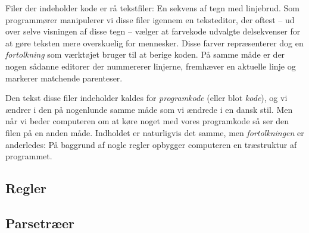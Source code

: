 Filer der indeholder kode er rå tekstfiler: En sekvens af tegn med linjebrud. Som programmører manipulerer vi disse filer igennem en teksteditor, der oftest -- ud over selve visningen af disse tegn -- vælger at farvekode udvalgte delsekvenser for at gøre teksten mere overskuelig for mennesker. Disse farver repræsenterer dog en \textsl{fortolkning} som værktøjet bruger til at berige koden. På samme måde er der nogen sådanne editorer der nummererer linjerne, fremhæver en aktuelle linje og markerer matchende parenteser.

Den tekst disse filer indeholder kaldes for \textsl{programkode} (eller blot \textsl{kode}), og vi ændrer i den på nogenlunde samme måde som vi ændrede i en dansk stil. Men når vi beder computeren om at køre noget med vores programkode så ser den filen på en anden måde. Indholdet er naturligvis det samme, men \textsl{fortolkningen} er anderledes: På baggrund af nogle regler opbygger computeren en træstruktur af programmet.


\subsection{Regler}


\subsection{Parsetræer}

